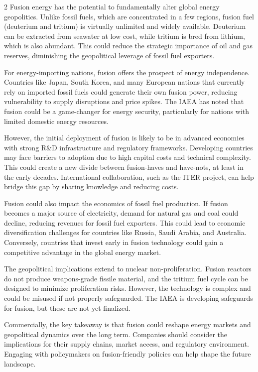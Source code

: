 \documentclass[10pt,a4paper]{article}
\begin{document}
\begin{multicols}{2}
{\small Fusion energy has the potential to fundamentally alter global energy geopolitics. Unlike fossil fuels, which are concentrated in a few regions, fusion fuel (deuterium and tritium) is virtually unlimited and widely available. Deuterium can be extracted from seawater at low cost, while tritium is bred from lithium, which is also abundant. This could reduce the strategic importance of oil and gas reserves, diminishing the geopolitical leverage of fossil fuel exporters.}\par
{\small For energy-importing nations, fusion offers the prospect of energy independence. Countries like Japan, South Korea, and many European nations that currently rely on imported fossil fuels could generate their own fusion power, reducing vulnerability to supply disruptions and price spikes. The IAEA has noted that fusion could be a game-changer for energy security, particularly for nations with limited domestic energy resources.}\par
{\small However, the initial deployment of fusion is likely to be in advanced economies with strong R\&D infrastructure and regulatory frameworks. Developing countries may face barriers to adoption due to high capital costs and technical complexity. This could create a new divide between fusion-haves and have-nots, at least in the early decades. International collaboration, such as the ITER project, can help bridge this gap by sharing knowledge and reducing costs.}\par
{\small Fusion could also impact the economics of fossil fuel production. If fusion becomes a major source of electricity, demand for natural gas and coal could decline, reducing revenues for fossil fuel exporters. This could lead to economic diversification challenges for countries like Russia, Saudi Arabia, and Australia. Conversely, countries that invest early in fusion technology could gain a competitive advantage in the global energy market.}\par
{\small The geopolitical implications extend to nuclear non-proliferation. Fusion reactors do not produce weapons-grade fissile material, and the tritium fuel cycle can be designed to minimize proliferation risks. However, the technology is complex and could be misused if not properly safeguarded. The IAEA is developing safeguards for fusion, but these are not yet finalized.}\par
{\small Commercially, the key takeaway is that fusion could reshape energy markets and geopolitical dynamics over the long term. Companies should consider the implications for their supply chains, market access, and regulatory environment. Engaging with policymakers on fusion-friendly policies can help shape the future landscape.}\par
\end{multicols}
\label{chap:3:end}
\end{document}
